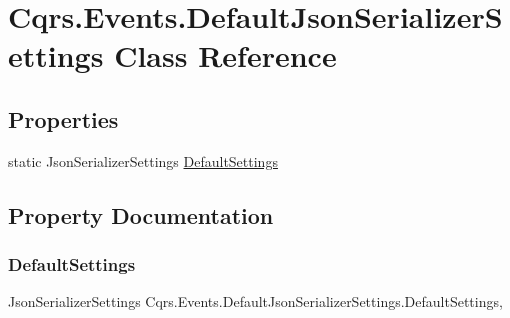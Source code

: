\hypertarget{classCqrs_1_1Events_1_1DefaultJsonSerializerSettings}{}\section{Cqrs.\+Events.\+Default\+Json\+Serializer\+Settings Class Reference}
\label{classCqrs_1_1Events_1_1DefaultJsonSerializerSettings}
\subsection*{Properties}
\begin{DoxyCompactItemize}
\item 
static Json\+Serializer\+Settings \hyperlink{classCqrs_1_1Events_1_1DefaultJsonSerializerSettings_af3524ebd3c1576ca4e33bcfbaad56740}{Default\+Settings}
\end{DoxyCompactItemize}


\subsection{Property Documentation}
\mbox{\label{classCqrs_1_1Events_1_1DefaultJsonSerializerSettings_af3524ebd3c1576ca4e33bcfbaad56740}} 
\subsubsection{\texorpdfstring{Default\+Settings}{DefaultSettings}}
{\footnotesize\ttfamily Json\+Serializer\+Settings Cqrs.\+Events.\+Default\+Json\+Serializer\+Settings.\+Default\+Settings\hspace{0.3cm}{\ttfamily [static]}, {\ttfamily [get]}}

